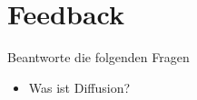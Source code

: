 \section{Feedback}
Beantworte die folgenden Fragen
\begin{itemize}
    \item Was ist Diffusion?
\end{itemize}
%
%